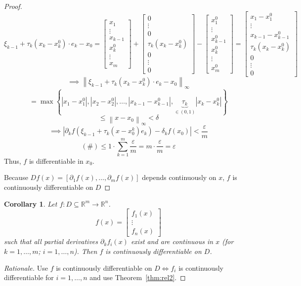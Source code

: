 \documentclass{article}
\newtheorem*{corollary}{Corollary}%
\newcommand{\set}[1]{\left\{#1\right\}}
\newcommand{\norm}[1]{\left\|#1\right\|}
\newcommand{\card}[1]{\left|#1\right|}
\begin{document}
\begin{proof}
  \[
    \xi_{k-1} + \tau_k (x_k - x_k^0) \cdot e_k - x_0
    = \begin{bmatrix} x_1 \\ \vdots \\ x_{k-1} \\ x_k^0 \\ \vdots \\ x_m \end{bmatrix}
    + \begin{bmatrix} 0 \\ \vdots \\ 0 \\ \tau_k(x_k - x_k^0) \\ 0 \\ \vdots \\ 0 \end{bmatrix}
    - \begin{bmatrix} x_1^0 \\ \vdots \\ x_{k-1}^0 \\ x_k^0 \\ \vdots \\ x_m^0 \end{bmatrix}
    = \begin{bmatrix} x_1 - x_1^0 \\ \vdots \\ x_{k-1} - x_{k-1}^0 \\ \tau_k(x_k - x_k^0) \\ 0 \\ \vdots \\ 0 \end{bmatrix}
  \] \[
    \implies
    \norm{\xi_{k-1} + \tau_k (x_k - x_k^0) \cdot e_k - x_0}_{\infty}
  \] \[
    = \max\set{\card{x_1 - x_1^0}, \card{x_2 - x_2^0}, \dots, \card{x_{k-1} - x_{k-1}^0}, \underbrace{\tau_k}_{\in (0,1)} \card{x_k - x_k^0}}
  \] \[
    \leq \norm{x - x_0}_{\infty}
    < \delta
  \] \[
    \implies \card{\partial_k f(\xi_{k-1} + \tau_k (x - x_0^k) e_k) - \delta_k f(x_0)} < \frac\varepsilon{m}
  \] \[
    (\#) \leq 1 \cdot \sum_{k=1}^m \frac\varepsilon m = m \cdot \frac\varepsilon m = \varepsilon
  \]
  Thus, $f$ is differentiable in $x_0$.

  Because $Df(x) = [\partial_1 f(x), \dots, \partial_m f(x)]$ depends continuously on $x$,
  $f$ is continuously differentiable on $D$
\end{proof}

\begin{corollary}
  Let $f: D \subseteq \mathbb R^m \to \mathbb R^n$.
  \[ f(x) = \begin{bmatrix} f_1(x) \\ \vdots \\ f_n(x) \end{bmatrix} \]
  such that all partial derivatives $\partial_k f_i(x)$ exist and are continuous in $x$ (for $k=1,\dots,m$; $i=1,\dots,n$).
  Then $f$ is continuously differentiable on $D$.
\end{corollary}
\begin{proof}[Rationale]
  Use $f$ is continuously differentiable on $D \iff f_i$ is continuously differentiable for $i = 1,\dots,n$ and use Theorem~\ref{thm:rel2}.
\end{proof}
\end{document}
